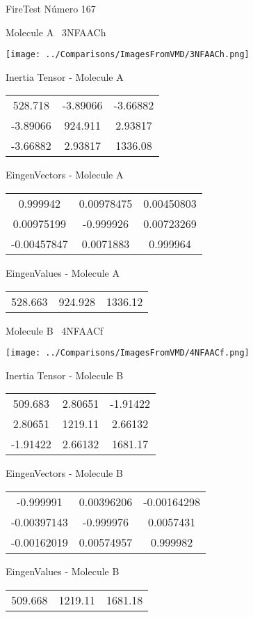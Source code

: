 \vtab[-3cm]
\begin{center}
{\large FireTest \tab Número 167}
\end{center}
\begin{multicols}{2}
\begin{center}

Molecule A \
3NFAACh

\texttt{[image: ../Comparisons/ImagesFromVMD/3NFAACh.png]}

Inertia Tensor - Molecule A \\
\begin{tabular}{|c c c|}
528.718	 & 	-3.89066	 & 	-3.66882	 \\
-3.89066	 & 	924.911	 & 	2.93817	 \\
-3.66882	 & 	2.93817	 & 	1336.08
\end{tabular}

\vtab
 EingenVectors - Molecule A     \\
\begin{tabular}{|c c c|}
0.999942	 & 	0.00978475	 & 	0.00450803	 \\
0.00975199	 & 	-0.999926	 & 	0.00723269	 \\
-0.00457847	 & 	0.0071883	 & 	0.999964
\end{tabular}

\vtab
 EingenValues - Molecule A     \\
\begin{tabular}{|c c c|}
528.663	 & 	924.928	 & 	1336.12	 \\
\end{tabular}
\columnbreak

Molecule B \
4NFAACf

\texttt{[image: ../Comparisons/ImagesFromVMD/4NFAACf.png]}

Inertia Tensor - Molecule B \\
\begin{tabular}{|c c c|}
509.683	 & 	2.80651	 & 	-1.91422	 \\
2.80651	 & 	1219.11	 & 	2.66132	 \\
-1.91422	 & 	2.66132	 & 	1681.17
\end{tabular}

\vtab
 EingenVectors - Molecule B     \\
\begin{tabular}{|c c c|}
-0.999991	 & 	0.00396206	 & 	-0.00164298	 \\
-0.00397143	 & 	-0.999976	 & 	0.0057431	 \\
-0.00162019	 & 	0.00574957	 & 	0.999982
\end{tabular}

\vtab
 EingenValues - Molecule B     \\
\begin{tabular}{|c c c|}
509.668	 & 	1219.11	 & 	1681.18	 \\
\end{tabular}

\end{center}
\end{multicols}

